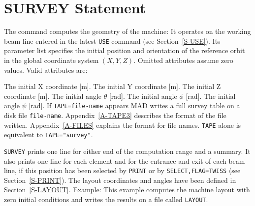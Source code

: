 \section{SURVEY Statement}
\label{S-SURVEY}
The  command computes the geometry of the machine:
It operates on the working beam line entered in the latest
{\tt USE} command (see Section~\ref{S-USE}).
Its parameter list specifies the initial position and orientation
of the reference orbit in the global coordinate system \((X,Y,Z)\).
Omitted attributes assume zero values.
Valid attributes are:
\begin{mylist}
The initial X coordinate [m].
The initial Y coordinate [m].
The initial Z coordinate [m].
The initial angle \(\theta\) [rad].
The initial angle \(\phi\) [rad].
The initial angle \(\psi\) [rad].
If {\tt TAPE=file-name} appears
MAD writes a full survey table on a disk file {\tt file-name}.
Appendix~\ref{A-TAPE3} describes the format of the file written.
Appendix~\ref{A-FILES} explains the format for file names.
{\tt TAPE} alone is equivalent to {\tt TAPE="survey"}.
\end{mylist}
{\tt SURVEY} prints one line for either end of the computation range
and a summary.
It also prints one line for each element and
for the entrance and exit of each beam line,
if this position has been selected by {\tt PRINT} or
by {\tt SELECT,FLAG=TWISS} (see Section~\ref{S-PRINT}).
The layout coordinates and angles have been defined in
Section~\ref{S-LAYOUT}.
Example:
This example computes the machine layout with zero initial
conditions and writes the results on a file called {\tt LAYOUT}.
 
